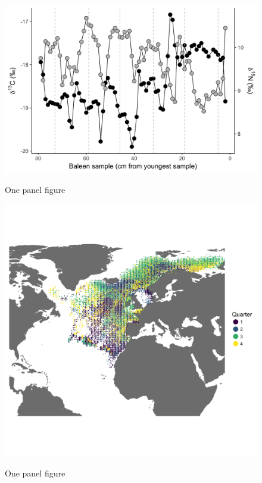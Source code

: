 \documentclass[a4paper,12pt]{article}
\begin{document}
\begin{figure}
  \centering
  \includegraphics[width = \linewidth]{figures/Figure-1a-raw-dC-dN-data.png}
  \label{fig11a}
  \caption{One panel figure}
\end{figure}

\begin{figure}
  \centering
  \includegraphics[width = \linewidth]{figures/Figure-1b-migratory-model-full-map.png}
  \label{fig11b}
  \caption{One panel figure}
\end{figure}
\end{document}
